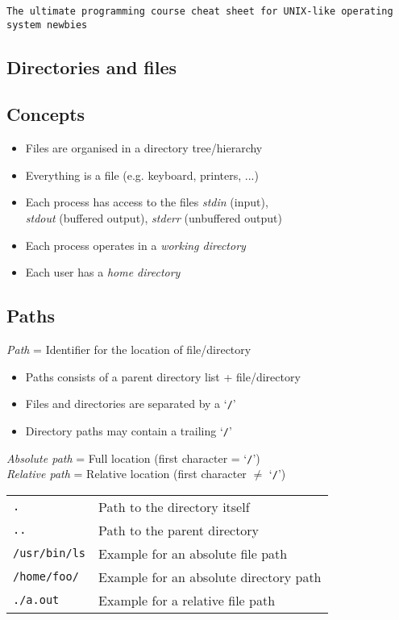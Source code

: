 \documentclass[landscape, a4paper]{article}
\newcommand{\cl}[1]{\texttt{#1}}
\begin{document}
\begin{center}
    \cl{The ultimate programming course cheat sheet for UNIX-like operating system newbies}
\end{center}
\begin{multicols*}{3}
\section*{\centering Directories and files}
\subsection*{Concepts}
\begin{itemize}
    \item Files are organised in a directory tree/hierarchy
    \item Everything is a file (e.g. keyboard, printers, ...)
    \item Each process has access to the files \textit{stdin} (input),\\
          \textit{stdout} (buffered output), \textit{stderr} (unbuffered output)
    \item Each process operates in a \textit{working directory}
    \item Each user has a \textit{home directory}
\end{itemize}
\subsection*{Paths}
\textit{Path} = Identifier for the location of file/directory
\begin{itemize}
    \item Paths consists of a parent directory list + file/directory
    \item Files and directories are separated by a `\cl{/}'
    \item Directory paths may contain a trailing `\cl{/}'
\end{itemize}
\textit{Absolute path} = Full location (first character = `\cl{/}')\\
\textit{Relative path} = Relative location (first character $\neq$ `\cl{/}')
\begin{tabular}{ll}
\cl{.}              & Path to the directory itself\\
\cl{..}             & Path to the parent directory\\
\cl{/usr/bin/ls}    & Example for an absolute file path\\
\cl{/home/foo/}     & Example for an absolute directory path\\
\cl{./a.out}        & Example for a relative file path\\
\end{tabular}

\end{multicols*}
\end{document}
